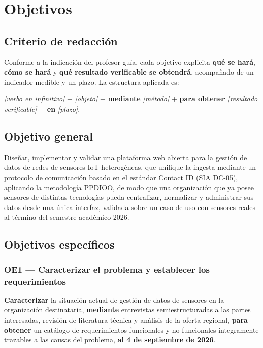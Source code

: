 \section{Objetivos}
\label{sec:objetivos}

\subsection{Criterio de redacción}

Conforme a la indicación del profesor guía, cada objetivo explicita \textbf{qué se hará}, \textbf{cómo
se hará} y \textbf{qué resultado verificable se obtendrá}, acompañado de un indicador medible y un
plazo. La estructura aplicada es:

\begin{cajadefinicion}
\emph{[verbo en infinitivo]} + \emph{[objeto]} + \textbf{mediante} \emph{[método]} + \textbf{para
obtener} \emph{[resultado verificable]} + \textbf{en} \emph{[plazo]}.
\end{cajadefinicion}

\subsection{Objetivo general}

\begin{cajaclave}[title={Objetivo general}]
Diseñar, implementar y validar una plataforma web abierta para la gestión de datos de redes de sensores
IoT heterogéneas, que unifique la ingesta mediante un protocolo de comunicación basado en el estándar
Contact ID (SIA DC-05), aplicando la metodología PPDIOO, de modo que una organización que ya posee
sensores de distintas tecnologías pueda centralizar, normalizar y administrar sus datos desde una única
interfaz, validada sobre un caso de uso con sensores reales al término del semestre académico 2026.
\end{cajaclave}

\subsection{Objetivos específicos}

\subsubsection{OE1 --- Caracterizar el problema y establecer los requerimientos}

\begin{cajadefinicion}
\textbf{Caracterizar} la situación actual de gestión de datos de sensores en la organización
destinataria, \textbf{mediante} entrevistas semiestructuradas a las partes interesadas, revisión de
literatura técnica y análisis de la oferta regional, \textbf{para obtener} un catálogo de requerimientos
funcionales y no funcionales íntegramente trazables a las causas del problema, \textbf{al 4 de septiembre
de 2026}.
\end{cajadefinicion}

